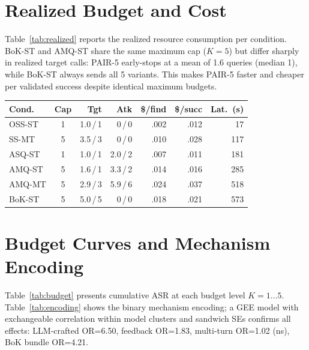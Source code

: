 \documentclass[11pt]{article}
\begin{document}
\section{Realized Budget and Cost}
\label{app:realized}

Table~\ref{tab:realized} reports the realized resource consumption per condition. BoK-ST and AMQ-ST share the same maximum cap ($K{=}5$) but differ sharply in realized target calls: PAIR-5 early-stops at a mean of 1.6 queries (median 1), while BoK-ST always sends all 5 variants. This makes PAIR-5 faster and cheaper per validated success despite identical maximum budgets.

\vspace{0.5em}
\nolinenumbers
\noindent
\begin{minipage}{\columnwidth}
\centering
\small
\setlength{\tabcolsep}{3pt}
\label{tab:realized}
\vspace{0.3em}
\begin{tabular}{lcrrrrr}
\toprule
\textbf{Cond.} & \textbf{Cap} & \textbf{Tgt} & \textbf{Atk} & \textbf{\$/find} & \textbf{\$/succ} & \textbf{Lat.\ (s)} \\
\midrule
OSS-ST & 1 & 1.0\,/\,1 & 0\,/\,0 & .002 & .012 & 17 \\
SS-MT & 5 & 3.5\,/\,3 & 0\,/\,0 & .010 & .028 & 117 \\
ASQ-ST & 1 & 1.0\,/\,1 & 2.0\,/\,2 & .007 & .011 & 181 \\
AMQ-ST & 5 & 1.6\,/\,1 & 3.3\,/\,2 & .014 & .016 & 285 \\
AMQ-MT & 5 & 2.9\,/\,3 & 5.9\,/\,6 & .024 & .037 & 518 \\
BoK-ST & 5 & 5.0\,/\,5 & 0\,/\,0 & .018 & .021 & 573 \\
\bottomrule
\end{tabular}
\end{minipage}
\linenumbers

\section{Budget Curves and Mechanism Encoding}
\label{app:budget}
\label{app:mechanism}

Table~\ref{tab:budget} presents cumulative ASR at each budget level $K{=}1{\ldots}5$. Table~\ref{tab:encoding} shows the binary mechanism encoding; a GEE model with exchangeable correlation within model clusters and sandwich SEs confirms all effects: LLM-crafted OR=6.50, feedback OR=1.83, multi-turn OR=1.02 (ns), BoK bundle OR=4.21.
\end{document}
